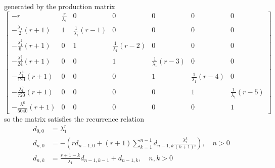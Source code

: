 generated by the production matrix
\begin{displaymath}
\left[\begin{matrix}- r & \frac{r}{\lambda_{1}} & 0 & 0 & 0 & 0 & 0\\- \frac{\lambda_{1}}{2} \left(r + 1\right) & 1 & \frac{1}{\lambda_{1}} \left(r - 1\right) & 0 & 0 & 0 & 0\\- \frac{\lambda_{1}^{2}}{6} \left(r + 1\right) & 0 & 1 & \frac{1}{\lambda_{1}} \left(r - 2\right) & 0 & 0 & 0\\- \frac{\lambda_{1}^{3}}{24} \left(r + 1\right) & 0 & 0 & 1 & \frac{1}{\lambda_{1}} \left(r - 3\right) & 0 & 0\\- \frac{\lambda_{1}^{4}}{120} \left(r + 1\right) & 0 & 0 & 0 & 1 & \frac{1}{\lambda_{1}} \left(r - 4\right) & 0\\- \frac{\lambda_{1}^{5}}{720} \left(r + 1\right) & 0 & 0 & 0 & 0 & 1 & \frac{1}{\lambda_{1}} \left(r - 5\right)\\- \frac{\lambda_{1}^{6}}{5040} \left(r + 1\right) & 0 & 0 & 0 & 0 & 0 & 1\end{matrix}\right]
\end{displaymath}
so the matrix satisfies the recurrence relation 
\begin{displaymath}
\begin{split}
d_{0,0}&=\lambda_{1}^{r}\\
d_{n,0}&=-\left(r d_{n-1, 0} + (r+1)\sum_{k=1}^{n-1}{d_{n-1, k}\frac{\lambda_{1}^{k}}{(k+1)!}}\right), \quad n>0 \\
d_{n,k}&=\frac{r+1-k}{\lambda_{1}}d_{n-1, k-1} + d_{n-1,k}, \quad n,k > 0\\
\end{split}
\end{displaymath}
\fi

